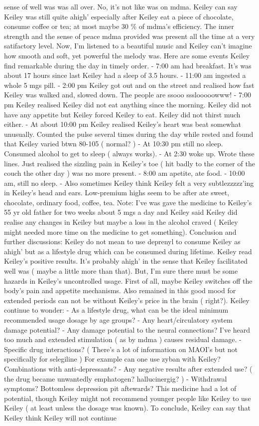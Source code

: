 \documentclass[12pt]{book}
\begin{document}
sense of well was was all over. No, it's not like was on mdma. Keiley can say Keiley was still quite ahigh' especially after Keiley eat a piece of chocolate, consume coffee or tea; at most maybe 30 \% of mdma's efficiency. The inner strength and the sense of peace mdma provided was present all the time at a very satifactory level. Now, I'm listened to a beautiful music and Keiley can't imagine how smooth and soft, yet powerful the melody was. Here are some events Keiley find remarkable during the day in timely order. - 7:00 am had breakfast. It's was about 17 hours since last Keiley had a sleep of 3.5 hours. - 11:00 am ingested a whole 5 mgs pill. - 2:00 pm Keiley got out and on the street and realised how fast Keiley was walked and, slowed down. The people are ssooo ssslooooowww! - 7:00 pm Keiley realised Keiley did not eat anything since the morning. Keiley did not have any appetite but Keiley forced Keiley to eat. Keiley did not thirst much either. - At about 10:00 pm Keiley realised Keiley's heart was beat somewhat unusually. Counted the pulse several times during the day while rested and found that Keiley varied btwn 80-105 ( normal? ) - At 10:30 pm still no sleep. Consumed alcohol to get to sleep ( always works). - At 2:30 woke up. Wrote these lines. Just realised the sizzling pain in Keiley's toe ( hit badly to the corner of the couch the other day ) was no more present. - 8:00 am apetite, ate food. - 10:00 am, still no sleep. - Also sometimes Keiley think Keiley felt a very subtlezzzzz'ing in Keiley's head and ears. Low-premium highs seem to be after ate sweet, chocolate, ordinary food, coffee, tea. Note: I've was gave the medicine to Keiley's 55 yr old father for two weeks about 5 mgs a day and Keiley said Keiley did realise any changes in Keiley but maybe a loss in the alcohol craved ( Keiley might needed more time on the medicine to get something). Conclusion and further discussions: Keiley do not mean to use deprenyl to consume Keiley as ahigh' but as a lifestyle drug which can be consumed during lifetime. Keiley read Keiley's positive results. It's probably ahigh' in the sense that Keiley facilitated well was ( maybe a little more than that). But, I'm sure there must be some hazards in Keiley's uncontrolled usage. First of all, maybe Keiley switches off the body's pain and appetite mechanisms. Also remained in this good mood for extended periods can not be without Keiley's price in the brain ( right?). Keiley continue to wonder: - As a lifestyle drug, what can be the ideal minimum recommended usage dosage by age groups? - Any heart/circulatory system damage potential? - Any damage potential to the neural connections? I've heard too much and extended stimulation ( as by mdma ) causes residual damage. - Specific drug interactions? ( There's a lot of information on MAOI's but not specifically for selegiline ) For example can one use zyban with Keiley? Combinations with anti-depressants? - Any negative results after extended use? ( the drug became unwantedly emphatogen? hallucinergig? ) - Withdrawal symptoms? Bottomless depression pit aftewards? This medicine had a lot of potential, though Keiley might not recommend younger people like Keiley to use Keiley ( at least unless the dosage was known). To conclude, Keiley can say that Keiley think Keiley will not continue 
\end{document}
